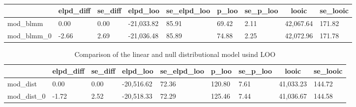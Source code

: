 \documentclass[
  doc,12pt,floatsintext]{apa7}
\begin{document}
\begin{table}[tbp]

\begin{center}
\begin{threeparttable}

\caption{\label{tab:loo-blmm-table}}

\begin{tabular}{lllllllll}
\toprule
 & \multicolumn{1}{c}{elpd\_diff} & \multicolumn{1}{c}{se\_diff} & \multicolumn{1}{c}{elpd\_loo} & \multicolumn{1}{c}{se\_elpd\_loo} & \multicolumn{1}{c}{p\_loo} & \multicolumn{1}{c}{se\_p\_loo} & \multicolumn{1}{c}{looic} & \multicolumn{1}{c}{se\_looic}\\
\midrule
mod\_blmm & 0.00 & 0.00 & -21,033.82 & 85.91 & 69.42 & 2.11 & 42,067.64 & 171.82\\
mod\_blmm\_0 & -2.66 & 2.69 & -21,036.48 & 85.89 & 74.88 & 2.25 & 42,072.96 & 171.78\\
\bottomrule
\end{tabular}

\end{threeparttable}
\end{center}

\end{table}

\begin{table}[tbp]

\begin{center}
\begin{threeparttable}

\caption{\label{tab:loo-dist-table}Comparison of the linear and null distributional model usind LOO}

\begin{tabular}{lllllllll}
\toprule
 & \multicolumn{1}{c}{elpd\_diff} & \multicolumn{1}{c}{se\_diff} & \multicolumn{1}{c}{elpd\_loo} & \multicolumn{1}{c}{se\_elpd\_loo} & \multicolumn{1}{c}{p\_loo} & \multicolumn{1}{c}{se\_p\_loo} & \multicolumn{1}{c}{looic} & \multicolumn{1}{c}{se\_looic}\\
\midrule
mod\_dist & 0.00 & 0.00 & -20,516.62 & 72.36 & 120.80 & 7.61 & 41,033.23 & 144.72\\
mod\_dist\_0 & -1.72 & 2.52 & -20,518.33 & 72.29 & 125.46 & 7.44 & 41,036.67 & 144.58\\
\bottomrule
\end{tabular}

\end{threeparttable}
\end{center}

\end{table}
\end{document}
